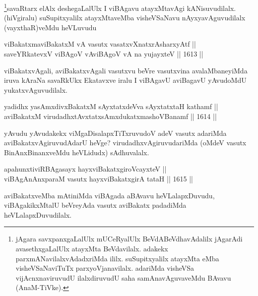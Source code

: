 \begin{artha}
\footnote{jAgara savxpanxgaLalUlx mUCeRyalUlx BeVdABeVdhavAdalilx jAgarAdi avasethxgaLalUlx atayxMta BeVdavilalx. adakekx parxmANavilalxvAdadxriMda ililx. suSupitxyalilx atayxMta eMba visheVSaNaviTuTx parxyoVjanavilalx. adariMda visheVSa vijAcnxnaviruvudU ilalxdiruvudU saha samAnavAguvaveMdu BAvavu (AnaM-TiVke).}savaRtarx elAlx deshegaLalUlx I viBAgavu atayxMtavAgi kANisuvudilalx. (hiVgiralu) suSupitxyalilx atayxMtaveMba visheVSaNavu nAyxyavAguvudilalx (vayxthaR)veMdu heVLuvudu
\end{artha}


\begin{shl}
viBakatxmaviBakatxM vA vasutx vasatxvXnatxrAsharxyAtf ||  \\
saveYRkatevxV viBAgoV vA\s viBAgoV vA na yujayxteV ||  1613 ||  
\end{shl}

\begin{artha}
viBakatxvAgali, aviBakatxvAgali vasutxvu beVre vasutxvina avalaMbaneyiMda iruva kAraNa savaRkUkx Ekatavxve iralu I viBAgavU aviBagavU yAvudoMdU yukatxvAguvudilalx.
\end{artha}

\begin{shl}
yadidhx yasAmxdivxBakatxM sAyxtatxdeVva sAyxtatxtaH kathamf || \\
aviBakatxM virudadhxtAvxtatxsAmxdukatxmashoVBanamf ||  1614 ||  
\end{shl}

\begin{artha}
yAvudu yAvudakekx viMgaDisalapxTiTxruvudoV adeV vasutx adariMda aviBakatxvAgiruvudAdarU heVge? virudadhxvAgiruvudariMda (oMdeV vasutx BinAnxBinanxveMdu heVLidudx) sAdhuvalalx.
\end{artha}

\begin{shl}
apahunxtiviRBAgasayx hayxviBakatxgiroVcayxteV ||  \\
viBAgAnAnxparaM vasutx hayxviBakatxgirA tataH ||  1615 ||  
\end{shl}

\begin{artha}
aviBakatxveMba mAtiniMda viBAgada aBAvavu heVLalapxDuvudu, viBAgakikxMtalU beVreyAda vasutx aviBakatx padadiMda heVLalapxDuvudilalx.
\end{artha}


